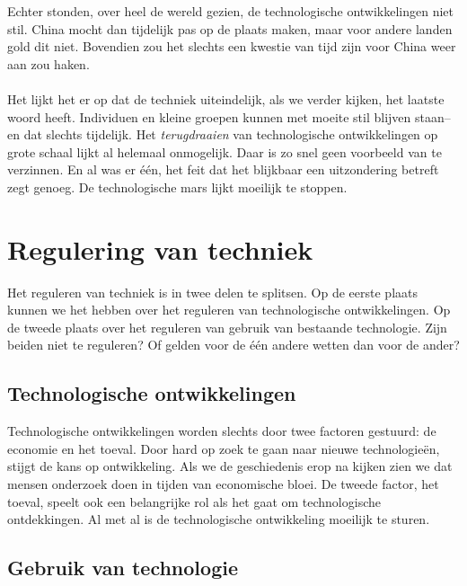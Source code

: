 \documentclass[11pt]{report}
\begin{document}
Echter stonden, over heel de wereld gezien, de technologische ontwikkelingen niet stil. China mocht dan tijdelijk pas op de plaats maken, maar voor andere landen gold dit niet. Bovendien zou het slechts een kwestie van tijd zijn voor China weer aan zou haken.

\paragraph{}

Het lijkt het er op dat de techniek uiteindelijk, als we verder kijken, het laatste woord heeft. Individuen en kleine groepen kunnen met moeite stil blijven staan--en dat slechts tijdelijk. Het \emph{terugdraaien} van technologische ontwikkelingen op grote schaal lijkt al helemaal onmogelijk. Daar is zo snel geen voorbeeld van te verzinnen. En al was er \'e\'en, het feit dat het blijkbaar een uitzondering betreft zegt genoeg. De technologische mars lijkt moeilijk te stoppen.


\section{Regulering van techniek}

Het reguleren van techniek is in twee delen te splitsen. Op de eerste plaats kunnen we het hebben over het reguleren van technologische ontwikkelingen. Op de tweede plaats over het reguleren van gebruik van bestaande technologie. Zijn beiden niet te reguleren? Of gelden voor de \'e\'en andere wetten dan voor de ander?

\subsection*{Technologische ontwikkelingen}

Technologische ontwikkelingen worden slechts door twee factoren gestuurd: de economie en het toeval. Door hard op zoek te gaan naar nieuwe technologie\"en, stijgt de kans op ontwikkeling. Als we de geschiedenis erop na kijken zien we dat mensen onderzoek doen in tijden van economische bloei. De tweede factor, het toeval, speelt ook een belangrijke rol als het gaat om technologische ontdekkingen. Al met al is de technologische ontwikkeling moeilijk te sturen.

\subsection*{Gebruik van technologie}
\end{document}
